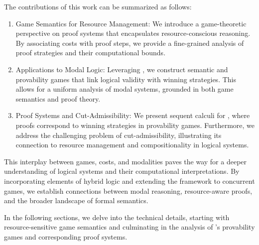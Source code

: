 The contributions of this work can be summarized as follows:
\begin{enumerate}
\item Game Semantics for Resource Management: We introduce a game-theoretic perspective on proof systems that encapsulates resource-conscious reasoning. By associating costs with proof steps, we provide a fine-grained analysis of proof strategies and their computational bounds.
\item Applications to Modal Logic: Leveraging \PNL, we construct semantic and provability games that link logical validity with winning strategies. This allows for a uniform analysis of modal systems, grounded in both game semantics and proof theory.
\item Proof Systems and Cut-Admissibility: We present sequent calculi for \PNL, where proofs correspond to winning strategies in provability games. Furthermore, we address the challenging problem of cut-admissibility, illustrating its connection to resource management and compositionality in logical systems.
\end{enumerate}
This interplay between games, costs, and modalities paves the way for a deeper understanding of logical systems and their computational interpretations. By incorporating elements of hybrid logic and extending the framework to concurrent games, we establish connections between modal reasoning, resource-aware proofs, and the broader landscape of formal semantics. 

In the following sections, we delve into the technical details, starting with resource-sensitive game semantics and culminating in the analysis of \PNL's provability games and corresponding proof systems.

